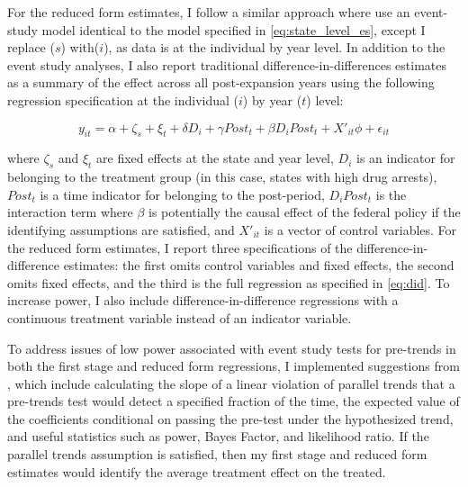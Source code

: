 \documentclass{article}
\begin{document}
For the reduced form estimates, I follow a similar approach where use an event-study model identical to the model specified in \ref{eq:state_level_es}, except I replace ($s$) with($i$), as data is at the individual by year level. In addition to the event study analyses, I also report traditional difference-in-differences estimates as a summary of the effect across all post-expansion years using the following regression specification at the individual ($i$) by year ($t$) level: 

\begin{equation} \label{eq:did}
  y_{it} = \alpha + \zeta_s + \xi_t + \delta D_i + \gamma Post_t + \beta D_i Post_t + X'_{it}\phi + \epsilon_{it}
\end{equation}

where $\zeta_s$ and $\xi_t$ are fixed effects at the state and year level, $D_{i}$ is an indicator for belonging to the treatment group (in this case, states with high drug arrests), $Post_t$ is a time indicator for belonging to the post-period, $D_i Post_t$ is the interaction term where $\beta$ is potentially the causal effect of the federal policy if the identifying assumptions are satisfied, and $X'_{it}$ is a vector of control variables. For the reduced form estimates, I report three specifications of the difference-in-difference estimates: the first omits control variables and fixed effects, the second omits fixed effects, and the third is the full regression as specified in \ref{eq:did}. To increase power, I also include difference-in-difference regressions with a continuous treatment variable instead of an indicator variable.

To address issues of low power associated with event study tests for pre-trends in both the first stage and reduced form regressions, I implemented suggestions from \cite{roth2022}, which include calculating the slope of a linear violation of parallel trends that a pre-trends test would detect a specified fraction of the time, the expected value of the coefficients conditional on passing the pre-test under the hypothesized trend, and useful statistics such as power, Bayes Factor, and likelihood ratio. If the parallel trends assumption is satisfied, then my first stage and reduced form estimates would identify the average treatment effect on the treated.
\end{document}
